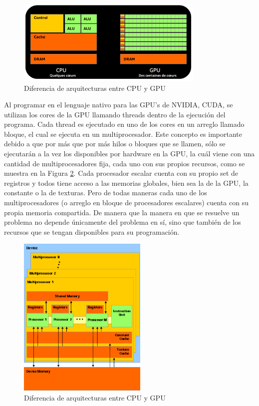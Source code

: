 \documentclass{article}
\begin{document}
\begin{figure}[H]
\centering
	\includegraphics[width=0.8\textwidth]{im/archi-GPU-vs-CPU}
	\caption[Diferencia de arquitecturas entre CPU y GPU]{Diferencia de arquitecturas entre CPU y GPU\footnotemark}
	\label{fig:cvsg}
\end{figure}

Al programar en el lenguaje nativo para las GPU's de NVIDIA, CUDA, se utilizan los cores de la GPU llamando threads dentro de la ejecución del programa. Cada thread es ejecutado en uno de los cores en un arreglo llamado bloque, el cual se ejecuta en un multiprocesador. Este concepto es importante debido a que por más que por más hilos o bloques que se llamen, sólo se ejecutarán a la vez los disponibles por hardware en la GPU, la cuál viene con una cantidad de multiprocesadores fija, cada uno con sus propios recursos, como se muestra en la Figura \ref{fig:multi}. Cada procesador escalar cuenta con su propio set de registros y todos tiene acceso a las memorias globales, bien sea la de la GPU, la constante o la de texturas. Pero de todas maneras cada uno de los multiprocesadores (o arreglo en bloque de procesadores escalares) cuenta con su propia memoria compartida. De manera que la manera en que se resuelve un problema no depende únicamente del problema en sí, sino que también de los recursos que se tengan disponibles para su programación. 

\begin{figure}[ht]
\centering
	\includegraphics[width=0.55\textwidth]{im/arqui}
	\caption{Diferencia de arquitecturas entre CPU y GPU \cite{jpeg}}
	\label{fig:multi}
\end{figure}
\end{document}
